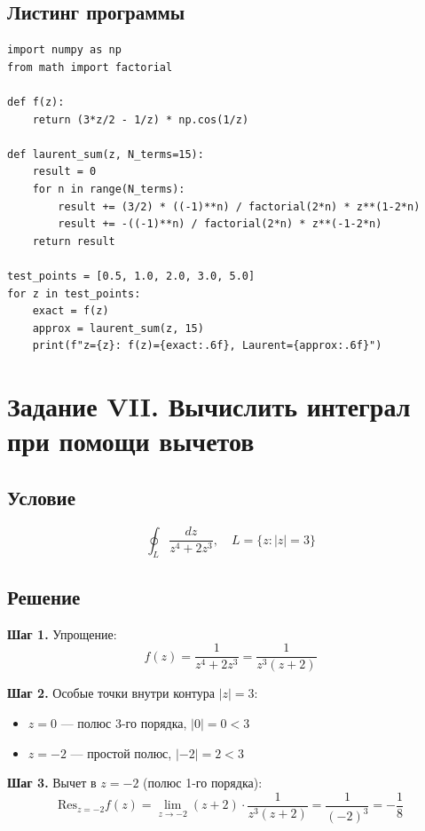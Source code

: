 \documentclass[12pt,a4paper]{article}
\begin{document}
\subsection{Листинг программы}
\begin{lstlisting}[caption={Разложение в ряд Лорана}]
import numpy as np
from math import factorial

def f(z):
    return (3*z/2 - 1/z) * np.cos(1/z)

def laurent_sum(z, N_terms=15):
    result = 0
    for n in range(N_terms):
        result += (3/2) * ((-1)**n) / factorial(2*n) * z**(1-2*n)
        result += -((-1)**n) / factorial(2*n) * z**(-1-2*n)
    return result

test_points = [0.5, 1.0, 2.0, 3.0, 5.0]
for z in test_points:
    exact = f(z)
    approx = laurent_sum(z, 15)
    print(f"z={z}: f(z)={exact:.6f}, Laurent={approx:.6f}")
\end{lstlisting}

\newpage
\section{Задание VII. Вычислить интеграл при помощи вычетов}

\subsection{Условие}
\[
\oint_L \frac{dz}{z^4 + 2z^3}, \quad L = \{z : |z| = 3\}
\]

\subsection{Решение}

\textbf{Шаг 1.} Упрощение:
\[
f(z) = \frac{1}{z^4 + 2z^3} = \frac{1}{z^3(z + 2)}
\]

\textbf{Шаг 2.} Особые точки внутри контура $|z| = 3$:
\begin{itemize}
    \item $z = 0$ --- полюс 3-го порядка, $|0| = 0 < 3$ \checkmark
    \item $z = -2$ --- простой полюс, $|-2| = 2 < 3$ \checkmark
\end{itemize}

\textbf{Шаг 3.} Вычет в $z = -2$ (полюс 1-го порядка):
\[
\text{Res}_{z=-2} f(z) = \lim_{z \to -2} (z+2) \cdot \frac{1}{z^3(z+2)} = \frac{1}{(-2)^3} = -\frac{1}{8}
\]
\end{document}
